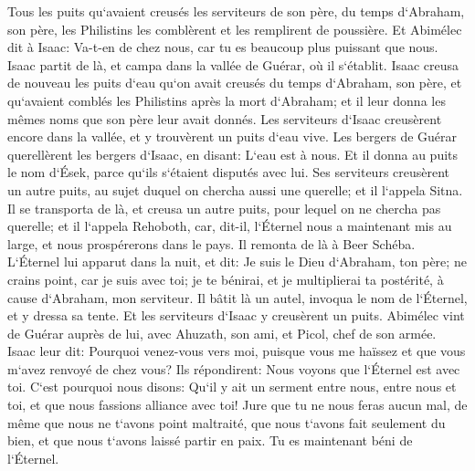 \verse Tous les puits qu`avaient creusés les serviteurs de son père, du temps d`Abraham, son père, les Philistins les comblèrent et les remplirent de poussière. 
\verse Et Abimélec dit à Isaac: Va-t-en de chez nous, car tu es beaucoup plus puissant que nous. 
\verse Isaac partit de là, et campa dans la vallée de Guérar, où il s`établit. 
\verse Isaac creusa de nouveau les puits d`eau qu`on avait creusés du temps d`Abraham, son père, et qu`avaient comblés les Philistins après la mort d`Abraham; et il leur donna les mêmes noms que son père leur avait donnés. 
\verse Les serviteurs d`Isaac creusèrent encore dans la vallée, et y trouvèrent un puits d`eau vive. 
\verse Les bergers de Guérar querellèrent les bergers d`Isaac, en disant: L`eau est à nous. Et il donna au puits le nom d`Ések, parce qu`ils s`étaient disputés avec lui. 
\verse Ses serviteurs creusèrent un autre puits, au sujet duquel on chercha aussi une querelle; et il l`appela Sitna. 
\verse Il se transporta de là, et creusa un autre puits, pour lequel on ne chercha pas querelle; et il l`appela Rehoboth, car, dit-il, l`Éternel nous a maintenant mis au large, et nous prospérerons dans le pays. 
\verse Il remonta de là à Beer Schéba. 
\verse L`Éternel lui apparut dans la nuit, et dit: Je suis le Dieu d`Abraham, ton père; ne crains point, car je suis avec toi; je te bénirai, et je multiplierai ta postérité, à cause d`Abraham, mon serviteur. 
\verse Il bâtit là un autel, invoqua le nom de l`Éternel, et y dressa sa tente. Et les serviteurs d`Isaac y creusèrent un puits. 
\verse Abimélec vint de Guérar auprès de lui, avec Ahuzath, son ami, et Picol, chef de son armée. 
\verse Isaac leur dit: Pourquoi venez-vous vers moi, puisque vous me haïssez et que vous m`avez renvoyé de chez vous? 
\verse Ils répondirent: Nous voyons que l`Éternel est avec toi. C`est pourquoi nous disons: Qu`il y ait un serment entre nous, entre nous et toi, et que nous fassions alliance avec toi! 
\verse Jure que tu ne nous feras aucun mal, de même que nous ne t`avons point maltraité, que nous t`avons fait seulement du bien, et que nous t`avons laissé partir en paix. Tu es maintenant béni de l`Éternel. 
